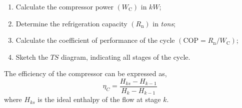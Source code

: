 \documentclass[calculator,datasheet,sample]{exam}
\newcommand{\frc}{\displaystyle\frac}
\begin{document}
\begin{question}
\begin{enumerate}
\item Calculate the compressor power $\left(W_{\text{C}}\right)$ in $kW$;~
%
%
\item Determine the refrigeration capacity $\left(R_{\text{n}}\right)$ in {\it tons};~
%
%
\item Calculate the coefficient of performance of the cycle $\left(\text{COP}=R_{\text{n}}/W_{\text{C}}\right)$;~
%
\solution{~\solmarks{2/2}
\begin{displaymath}
\text{COP}= \frc{W_{\text{C}}}{R_{\text{n}}}= 4.13
\end{displaymath}
}
%
\item Sketch the $TS$ diagram, indicating all stages of the cycle.~
%
%
\end{enumerate}

The efficiency of the compressor can be expressed as,
\begin{displaymath}
\eta_{C}=\frc{H_{ks}-H_{k-1}}{H_{k}-H_{k-1}} 
\end{displaymath}
where $H_{ks}$ is the ideal enthalpy of the flow at stage $k$.

\end{question}
\end{document}
